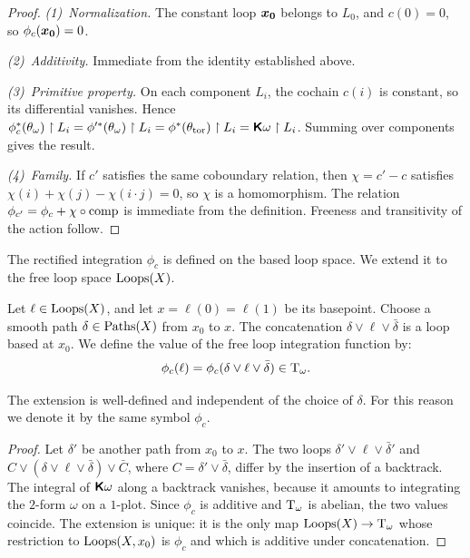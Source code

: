 \documentclass[11pt,reqno,letterpaper,twoside]{amsart}
\begin{document}
  \begin{proof}
    \textit{(1)~Normalization.}
    The constant loop $\boldsymbol{x_0}$ belongs to $L_0$,
    and $c(0) = 0$,
    so $\phi_c(\boldsymbol{x_0}) = 0$.
    
    \textit{(2)~Additivity.}
    Immediate from the identity established above.
    
    \textit{(3)~Primitive property.}
    On each component $L_i$, the cochain $c(i)$ is constant,
    so its differential vanishes.
    Hence $\phi_c^*(\theta_\omega) \restriction L_i = \phi'^*(\theta_\omega) \restriction L_i = \phi^*(\theta_{\mathrm{tor}}) \restriction L_i = \boldsymbol{\mathsf{K}}\omega \restriction L_i$.
    Summing over components gives the result.
    
    \textit{(4)~Family.}
    If $c'$ satisfies the same coboundary relation,
    then $\chi = c' - c$ satisfies $\chi(i) + \chi(j) - \chi(i \cdot j) = 0$,
    so $\chi$ is a homomorphism.
    The relation $\phi_{c'} = \phi_c + \chi \circ \operatorname{comp}$ is immediate from the definition.
    Freeness and transitivity of the action follow.
  \end{proof}
  
  \begin{article}
    \label{art:Extension to the Free Loop Space}
    
    The rectified integration $\phi_c$ is defined on the based loop space.
    We extend it to the free loop space $\operatorname{Loops}(X)$.
    
    Let $\ell \in \operatorname{Loops}(X)$,
    and let $x = \ell(0) = \ell(1)$ be its basepoint.
    Choose a smooth path $\delta \in \operatorname{Paths}(X)$ from $x_0$ to $x$.
    The concatenation $\delta \vee \ell \vee \bar\delta$ is a loop based at $x_0$.
    We define the value of the free loop integration function by:
    \[
      \phi_c(\ell) = \phi_c(\delta \vee \ell \vee \bar\delta) \in \mathrm{T}_\omega.
      \]
    
    \begin{proposition}
      The extension is well-defined and independent of the choice of $\delta$.
      For this reason we denote it by the same symbol $\phi_c$.
    \end{proposition}
  \end{article}
  
  \begin{proof}
    Let $\delta'$ be another path from $x_0$ to $x$.
    The two loops $\delta' \vee \ell \vee \bar\delta'$ and $C \vee (\delta \vee \ell \vee \bar\delta) \vee \bar C$,
    where $C = \delta' \vee \bar\delta$,
    differ by the insertion of a backtrack.
    The integral of $\boldsymbol{\mathsf{K}}\omega$ along a backtrack vanishes,
    because it amounts to integrating the $2$-form $\omega$ on a $1$-plot.
    Since $\phi_c$ is additive and $\mathrm{T}_\omega$ is abelian,
    the two values coincide.
    The extension is unique:
    it is the only map $\operatorname{Loops}(X) \to \mathrm{T}_\omega$ whose restriction to $\operatorname{Loops}(X, x_0)$ is $\phi_c$ and which is additive under concatenation.
  \end{proof}
  
\end{document}

